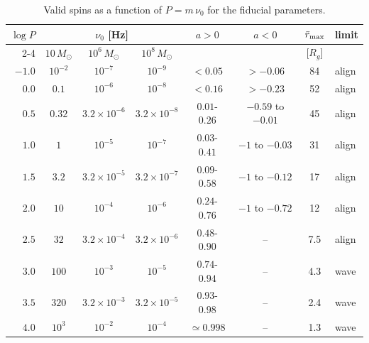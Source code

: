 \begin{table}
\caption{Valid spins as a function of $P=m\,\nu_0$ for the fiducial parameters.}
\label{tab:AP}
\centering
\begin{tabular}{rccccccl}
\hline\hline
$\log P$ & \multicolumn{3}{c}{$\nu_0$ [Hz]} & $a>0$ & $a<0$ & $\bar r_\textup{max}$ & limit \\
\cline{2-4}
 & $10\,M_\odot$ & $10^6\,M_\odot$ & $10^8\,M_\odot$ & & & [$R_g$] & \\
\hline
$-1.0$ & $10^{-2}$          & $10^{-7}$          & $10^{-9}$          & $<0.05$         & $>-0.06$            & 84   & align \\
$0.0$  & $0.1$              & $10^{-6}$          & $10^{-8}$          & $<0.16$         & $>-0.23$            & 52   & align \\
$0.5$  & $0.32$             & $3.2\times10^{-6}$ & $3.2\times10^{-8}$ & $0.01$-$0.26$  & $-0.59$ to $-0.01$  & 45   & align \\
$1.0$  & $1$                & $10^{-5}$          & $10^{-7}$          & $0.03$-$0.41$  & $-1$ to $-0.03$     & 31   & align \\
$1.5$  & $3.2$              & $3.2\times10^{-5}$ & $3.2\times10^{-7}$ & $0.09$-$0.58$  & $-1$ to $-0.12$     & 17   & align \\
$2.0$  & $10$               & $10^{-4}$          & $10^{-6}$          & $0.24$-$0.76$  & $-1$ to $-0.72$     & 12   & align \\
$2.5$  & $32$               & $3.2\times10^{-4}$ & $3.2\times10^{-6}$ & $0.48$-$0.90$  & --                  & 7.5  & align \\
$3.0$  & $100$              & $10^{-3}$          & $10^{-5}$          & $0.74$-$0.94$  & --                  & 4.3  & wave \\
$3.5$  & $320$              & $3.2\times10^{-3}$ & $3.2\times10^{-5}$ & $0.93$-$0.98$  & --                  & 2.4  & wave \\
$4.0$  & $10^3$             & $10^{-2}$          & $10^{-4}$          & $\simeq0.998$   & --                  & 1.3  & wave \\
\hline
\end{tabular}
\end{table}


